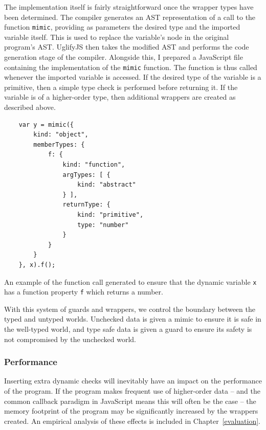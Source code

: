 \documentclass[12pt,a4paper,twoside,openright]{report}
\theoremstyle{definition}
\theoremstyle{dotless}
\begin{document}
The implementation itself is fairly straightforward once the wrapper types 
have been determined. The compiler generates an AST representation of a
call to the function \texttt{mimic}, providing as parameters 
the desired type and the imported variable itself. This is used to replace the 
variable's node in the original program's AST. UglifyJS then takes the modified AST and 
performs the code generation stage of the compiler. Alongside this, I prepared
a JavaScript file containing the implementation of the \texttt{mimic} function. 
The function is thus called whenever the imported variable is accessed. If the
desired type of the variable is a primitive, then a simple type check is performed 
before returning it. If the variable is of a higher-order type, then additional
wrappers are created as described above.
\begin{program}
  \begin{verbatim}
	var y = mimic({
	    kind: "object",
	    memberTypes: {
	        f: {
	            kind: "function",
	            argTypes: [ {
	                kind: "abstract"
	            } ],
	            returnType: {
	                kind: "primitive",
	                type: "number"
	            }
	        }
	    }
	}, x).f();
  \end{verbatim}
  \caption{An example of the function call generated to ensure that the 
  dynamic variable \texttt{x} has a function property \texttt{f} which returns a number.}
	\label{lst:importPrim}
\end{program}

With this system of guards and wrappers, we control the boundary between the
typed and untyped worlds. Unchecked data is given a mimic to ensure it is safe
in the well-typed world, and type safe data is given a guard to ensure its
safety is not compromised by the unchecked world.

\subsubsection*{Performance}

Inserting extra dynamic checks will inevitably have an impact on the
performance of the program. If the program makes frequent use of higher-order
data -- and the common callback paradigm in JavaScript means this will often be
the case -- the memory footprint of the program may be significantly increased
by the wrappers created. An empirical analysis of these effects is included in
Chapter~\ref{evaluation}.
\end{document}
